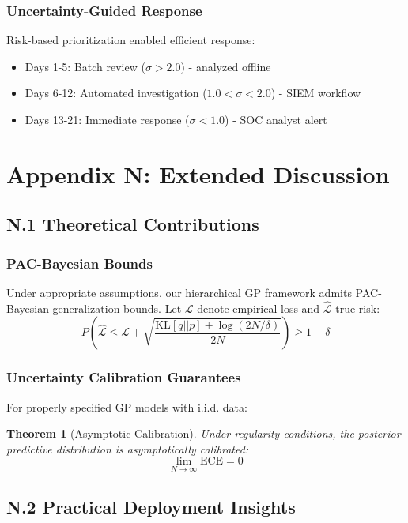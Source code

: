 \documentclass[12pt]{article}
\newtheorem{theorem}{Theorem}
\begin{document}
\subsubsection{Uncertainty-Guided Response}
Risk-based prioritization enabled efficient response:
\begin{itemize}
\item Days 1-5: Batch review ($\sigma>2.0$) - analyzed offline
\item Days 6-12: Automated investigation ($1.0<\sigma<2.0$) - SIEM workflow
\item Days 13-21: Immediate response ($\sigma<1.0$) - SOC analyst alert
\end{itemize}

\section{Appendix N: Extended Discussion}

\subsection{N.1 Theoretical Contributions}

\subsubsection{PAC-Bayesian Bounds}
Under appropriate assumptions, our hierarchical GP framework admits PAC-Bayesian generalization bounds. Let $\mathcal{L}$ denote empirical loss and $\hat{\mathcal{L}}$ true risk:
\begin{equation}
P\left(\hat{\mathcal{L}} \leq \mathcal{L} + \sqrt{\frac{\text{KL}[q||p] + \log(2N/\delta)}{2N}}\right) \geq 1-\delta
\end{equation}

\subsubsection{Uncertainty Calibration Guarantees}
For properly specified GP models with i.i.d. data:
\begin{theorem}[Asymptotic Calibration]
Under regularity conditions, the posterior predictive distribution is asymptotically calibrated:
\begin{equation}
\lim_{N\to\infty} \text{ECE} = 0
\end{equation}
\end{theorem}

\subsection{N.2 Practical Deployment Insights}
\end{document}
